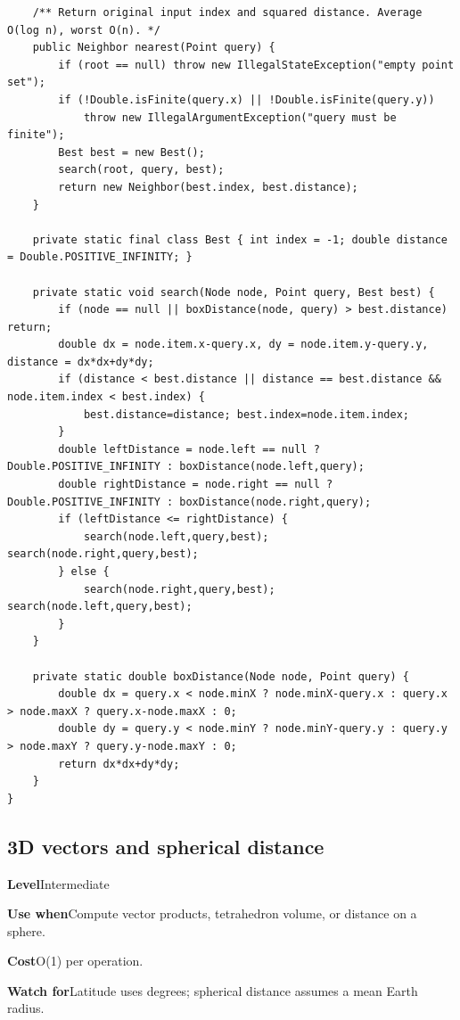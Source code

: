 \documentclass[10pt,letterpaper]{article}
\newcommand{\entrylabel}[1]{\textcolor{accent}{\bfseries #1}}
\begin{document}
\begin{lstlisting}
    /** Return original input index and squared distance. Average O(log n), worst O(n). */
    public Neighbor nearest(Point query) {
        if (root == null) throw new IllegalStateException("empty point set");
        if (!Double.isFinite(query.x) || !Double.isFinite(query.y))
            throw new IllegalArgumentException("query must be finite");
        Best best = new Best();
        search(root, query, best);
        return new Neighbor(best.index, best.distance);
    }

    private static final class Best { int index = -1; double distance = Double.POSITIVE_INFINITY; }

    private static void search(Node node, Point query, Best best) {
        if (node == null || boxDistance(node, query) > best.distance) return;
        double dx = node.item.x-query.x, dy = node.item.y-query.y, distance = dx*dx+dy*dy;
        if (distance < best.distance || distance == best.distance && node.item.index < best.index) {
            best.distance=distance; best.index=node.item.index;
        }
        double leftDistance = node.left == null ? Double.POSITIVE_INFINITY : boxDistance(node.left,query);
        double rightDistance = node.right == null ? Double.POSITIVE_INFINITY : boxDistance(node.right,query);
        if (leftDistance <= rightDistance) {
            search(node.left,query,best); search(node.right,query,best);
        } else {
            search(node.right,query,best); search(node.left,query,best);
        }
    }

    private static double boxDistance(Node node, Point query) {
        double dx = query.x < node.minX ? node.minX-query.x : query.x > node.maxX ? query.x-node.maxX : 0;
        double dy = query.y < node.minY ? node.minY-query.y : query.y > node.maxY ? query.y-node.maxY : 0;
        return dx*dx+dy*dy;
    }
}
\end{lstlisting}
\subsection{3D vectors and spherical distance}
\begin{guidebox}\small
\entrylabel{Level}\quad Intermediate\par
\entrylabel{Use when}\quad Compute vector products, tetrahedron volume, or distance on a sphere.\par
\entrylabel{Cost}\quad O(1) per operation.\par
\entrylabel{Watch for}\quad Latitude uses degrees; spherical distance assumes a mean Earth radius.\par
\end{guidebox}
\end{document}
